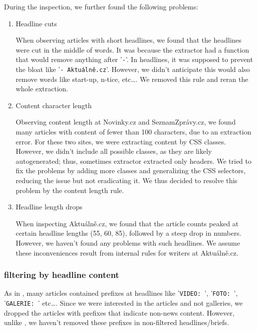 During the inspection, we further found the following problems:
\begin{enumerate}
    \item Headline cuts

          When observing articles with short headlines, we found that the headlines
          were cut in the middle of words.
          It was because the extractor had a function that would remove anything after '\verb|-|'.
          In headlines, it was supposed to prevent the bloat like '\verb|- Aktuálně.cz|'. However,
          we didn't anticipate this would also remove words like start-up, n‑tice, etc\dots.
          We removed this rule and reran the whole extraction.
    \item Content character length

          Observing content length at Novinky.cz and SeznamZprávy.cz, we found many articles with content of fewer than 100 characters, due to an extraction error.
          For these two sites, we were extracting content by CSS classes.
          However, we didn't include all possible classes, as they are likely autogenerated;
          thus, sometimes extractor extracted only headers.
          We tried to fix the problems by adding more classes and generalizing the CSS selectors,
          reducing the issue but not eradicating it. We thus decided to resolve this problem
          by the content length rule.

    \item Headline length drops

          When inspecting Aktuálně.cz, we found that the article counts peaked
          at certain headline lengths (55, 60, 85), followed by a steep drop in numbers.
          However, we haven't found any problems with such headlines.
          We assume these inconveniences result from internal rules for writers at Aktuálně.cz.
\end{enumerate}

\subsubsection{filtering by headline content}
As in \textcite{strakaSumeCzechLargeCzech2018a}, many articles
contained prefixes at headlines like '\verb|VIDEO: |', '\verb|FOTO: |', '\verb|GALERIE: |' etc\dots.
Since we were interested in the articles and not galleries,
we dropped the articles with prefixes that indicate non-news content.
However, unlike \textcite{strakaSumeCzechLargeCzech2018a}, we haven't removed these prefixes
in non-filtered headlines/briefs.




